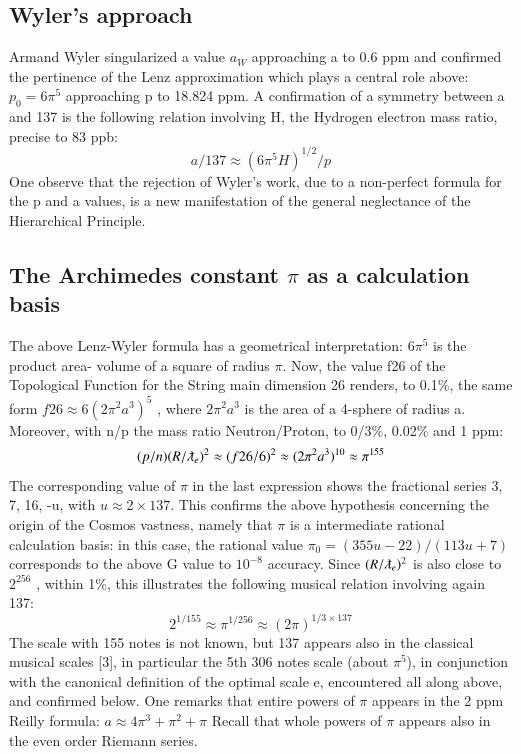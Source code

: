 \documentclass[twoside,draft]{article}
\begin{document}
\begin{sloppypar}
{\subsection {Wyler's approach}

Armand Wyler singularized a value $a_{W}$ approaching a to 0.6 ppm and confirmed the pertinence
of the Lenz approximation which plays a central role above: $p_{0} = 6\pi^{5}$ approaching p to 18.824 ppm.
A confirmation of a symmetry between a and 137 is the following relation involving H, the
Hydrogen electron mass ratio, precise to 83 ppb:
$$a/137 \approx (6\pi^{5} H)^{1/2} /p$$
One observe that the rejection of Wyler's work, due to a non-perfect formula for the p and a values, is a new
manifestation of the general neglectance of the Hierarchical Principle.

\subsection {The Archimedes constant $\pi$ as a calculation basis}

The above Lenz-Wyler formula has a geometrical interpretation: $6\pi^{5}$ is the product area-
volume of a square of radius $\pi$. Now, the value f{26} of the Topological Function for the String
main dimension 26 renders, to 0.1\%, the same form $f{26} \approx 6(2\pi^{2} a^{3} )^{5}$ , where $2\pi^{2}a^{3}$ is the area of a
4-sphere of radius a. Moreover, with n/p the mass ratio Neutron/Proton, to 0/3\%, 0.02\% and 1
ppm:
$$(p/n) (R/\lambdabar_{e})^{2} \approx (f{26}/6)^{2} \approx (2\pi^{2} a^{3})^{10} \approx \pi^{155}$$
The corresponding value of $\pi$ in the last expression shows the fractional series 3, 7, 16, -u, with $u \approx
2 \times 137$. This confirms the above hypothesis concerning the origin of the Cosmos vastness, namely
that $\pi$ is a intermediate rational calculation basis: in this case, the rational value $\pi_{0} = (355u-22)/
(113u+7)$ corresponds to the above G value to $10^{-8}$ accuracy.
Since $(R/\lambdabar_{e})^{2}$ is also close to $2^{256}$ , within 1\%, this illustrates the following musical relation
involving again 137:
$$2^{1/155} \approx \pi^{1/256} \approx (2\pi)^{1/3 \times 137}$$
The scale with 155 notes is not known, but 137 appears also in the classical musical scales [3], in
particular the 5th 306 notes scale (about $\pi^{5}$), in conjunction with the canonical definition of the optimal
scale e, encountered all along above, and confirmed below.
One remarks that entire powers of $\pi$ appears in the 2 ppm Reilly formula: $a \approx 4\pi^{3} + \pi^{2} + \pi$
Recall that whole powers of $\pi$ appears also in the even order Riemann series.

}
\end{sloppypar}
\end{document}
